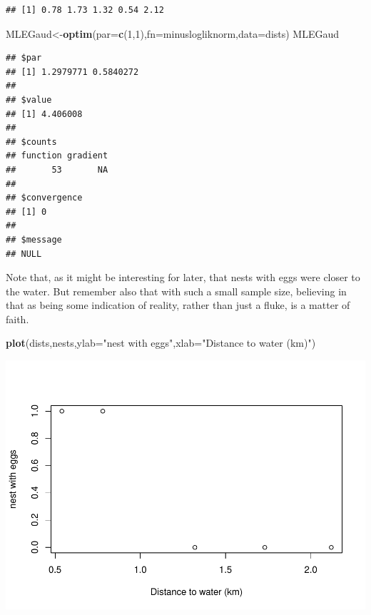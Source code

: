 \documentclass[
]{book}
\newenvironment{Shaded}{\begin{snugshade}}{\end{snugshade}}
\newcommand{\DataTypeTok}[1]{\textcolor[rgb]{0.13,0.29,0.53}{#1}}
\newcommand{\DecValTok}[1]{\textcolor[rgb]{0.00,0.00,0.81}{#1}}
\newcommand{\KeywordTok}[1]{\textcolor[rgb]{0.13,0.29,0.53}{\textbf{#1}}}
\newcommand{\NormalTok}[1]{#1}
\newcommand{\StringTok}[1]{\textcolor[rgb]{0.31,0.60,0.02}{#1}}
\begin{document}
\begin{verbatim}
## [1] 0.78 1.73 1.32 0.54 2.12
\end{verbatim}

\begin{Shaded}
\begin{Highlighting}[]
\NormalTok{MLEGaud<-}\KeywordTok{optim}\NormalTok{(}\DataTypeTok{par=}\KeywordTok{c}\NormalTok{(}\DecValTok{1}\NormalTok{,}\DecValTok{1}\NormalTok{),}\DataTypeTok{fn=}\NormalTok{minuslogliknorm,}\DataTypeTok{data=}\NormalTok{dists)}
\NormalTok{MLEGaud}
\end{Highlighting}
\end{Shaded}

\begin{verbatim}
## $par
## [1] 1.2979771 0.5840272
## 
## $value
## [1] 4.406008
## 
## $counts
## function gradient 
##       53       NA 
## 
## $convergence
## [1] 0
## 
## $message
## NULL
\end{verbatim}

Note that, as it might be interesting for later, that nests with eggs were closer to the water. But remember also that with such a small sample size, believing in that as being some indication of reality, rather than just a fluke, is a matter of faith.

\begin{Shaded}
\begin{Highlighting}[]
\KeywordTok{plot}\NormalTok{(dists,nests,}\DataTypeTok{ylab=}\StringTok{"nest with eggs"}\NormalTok{,}\DataTypeTok{xlab=}\StringTok{"Distance to water (km)"}\NormalTok{)}
\end{Highlighting}
\end{Shaded}

\includegraphics{ECOMODbook_files/figure-latex/ch13.24-1.pdf}
\end{document}
